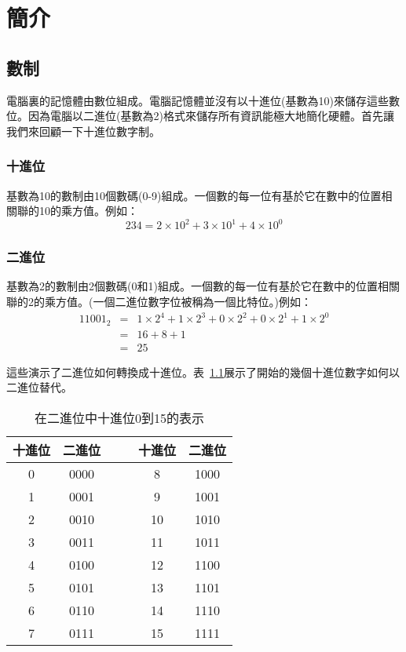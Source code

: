 \chapter{簡介}
\section{數制}

電腦裏的記憶體由數位組成。電腦記憶體並沒有以十進位(基數為10)來儲存這些數位。因為電腦以二進位(基數為2)格式來儲存所有資訊能極大地簡化硬體。首先讓我們來回顧一下十進位數字制。

\subsection{十進位}

基數為10的數制由10個數碼(0-9)組成。一個數的每一位有基於它在數中的位置相關聯的10的乘方值。例如：
\begin{displaymath}
234 = 2 \times 10^2 + 3 \times 10^1 + 4 \times 10^0
\end{displaymath}

\subsection{二進位}

基數為2的數制由2個數碼(0和1)組成。一個數的每一位有基於它在數中的位置相關聯的2的乘方值。(一個二進位數字位被稱為一個比特位。)例如：
\begin{eqnarray*}
11001_2 & = & 1 \times 2^4 + 1 \times 2^3 + 0 \times 2^2 + 0 \times 2^1
              + 1 \times 2^0 \\
 & = & 16 + 8 + 1 \\
 & = & 25
\end{eqnarray*}

這些演示了二進位如何轉換成十進位。表~\ref{tab:dec-bin}展示了開始的幾個十進位數字如何以二進位替代。
\begin{table}[t]
\begin{center}
\begin{tabular}{||c|c||cc||c|c||}
\hline
十進位 & 二進位 & & & 十進位 & 二進位 \\
\hline
0       & 0000   & & & 8       & 1000 \\
\hline
1       & 0001   & & & 9       & 1001 \\
\hline
2       & 0010   & & & 10      & 1010 \\
\hline
3       & 0011   & & & 11      & 1011 \\
\hline
4       & 0100   & & & 12      & 1100 \\
\hline
5       & 0101   & & & 13      & 1101 \\
\hline
6       & 0110   & & & 14      & 1110 \\
\hline
7       & 0111   & & & 15      & 1111 \\
\hline
\end{tabular}
\caption{在二進位中十進位0到15的表示\label{tab:dec-bin}}
\end{center}
\end{table}


